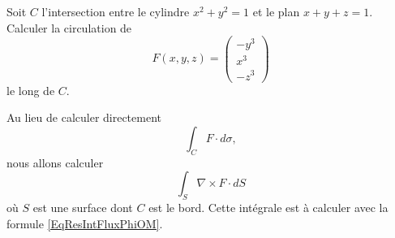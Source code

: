\begin{example}

    Soit $C$ l'intersection entre le cylindre $x^2+y^2=1$ et le plan $x+y+z=1$. Calculer la circulation de
    \begin{equation}
        F(x,y,z)=\begin{pmatrix}
            -y^3    \\ 
            x^3    \\ 
            -z^3    
        \end{pmatrix}
    \end{equation}
    le long de $C$. 

    Au lieu de calculer directement
    \begin{equation}
        \int_{C}F\cdot d\sigma,
    \end{equation}
    nous allons calculer
    \begin{equation}
        \int_S\nabla\times F\cdot dS
    \end{equation}
    où $S$ est une surface dont $C$ est le bord. Cette intégrale est à calculer avec la formule \eqref{EqResIntFluxPhiOM}.


\end{example}
